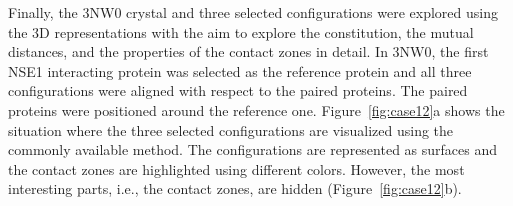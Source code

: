 \documentclass{bmcart}
\def\CoZoListView {Contact-Zone list-view\xspace}
\begin{document}



Finally, the 3NW0 crystal and three selected configurations were explored using the 3D representations with the aim to explore the constitution, the mutual distances, and the properties of the contact zones in detail.
In 3NW0, the first NSE1 interacting protein was selected as the reference protein and all three configurations were aligned with respect to the paired proteins.
The paired proteins were positioned around the reference one.
Figure~\ref{fig:case12}a shows the situation where the three selected configurations are visualized using the commonly available method.
The configurations are represented as surfaces and the contact zones are highlighted using different colors.
However, the most interesting parts, i.e., the contact zones, are hidden (Figure~\ref{fig:case12}b).
\end{document}
